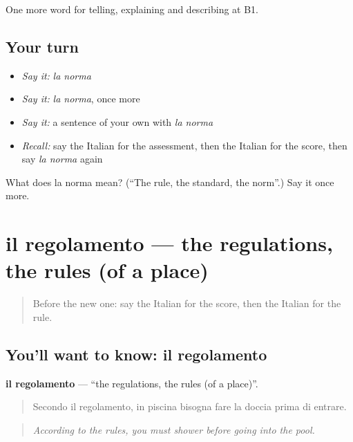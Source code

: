 \begin{grammarlens}[title={What you've built}]
One more word for telling, explaining and describing at B1.
\end{grammarlens}

\subsection*{Your turn}
\begin{itemize}
\raggedright
  \item \emph{Say it:} \emph{la norma}
  \item \emph{Say it:} \emph{la norma}, once more
  \item \emph{Say it:} a sentence of your own with \emph{la norma}
  \item \emph{Recall:} say the Italian for the assessment, then the Italian for the score, then say \emph{la norma} again
\end{itemize}

\begin{tcolorbox}[breakable,colback=teal!4,colframe=teal!35!black,title={Before you move on}]
What does la norma mean? (\textquotedblleft{}The rule, the standard, the norm\textquotedblright{}.) Say it once more.
\end{tcolorbox}
\section[il regolamento]{il regolamento — the regulations, the rules (of a place)}

\label{lesson:IT-C384-regolamento}



\begin{quote}
Before the new one: say the Italian for the score, then the Italian for the rule.
\end{quote}

\subsection*{You'll want to know: il regolamento}
\textbf{il regolamento} — \textquotedblleft{}the regulations, the rules (of a place)\textquotedblright{}.

\begin{quote}
Secondo il regolamento, in piscina bisogna fare la doccia prima di entrare.
\end{quote}

\begin{quote}
\emph{According to the rules, you must shower before going into the pool.}
\end{quote}

